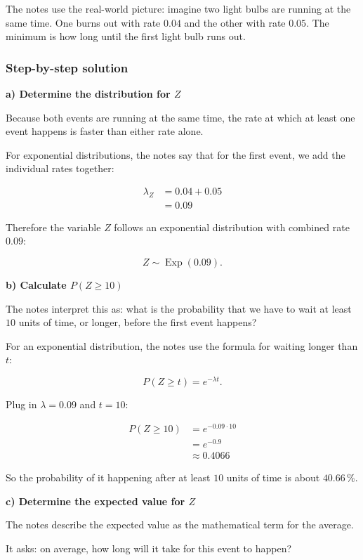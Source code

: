 \documentclass[10pt]{article}
\begin{document}
The notes use the real-world picture:
imagine two light bulbs are running at the same time.
One burns out with rate $0.04$ and the other with rate $0.05$.
The minimum is how long until the first light bulb runs out.

\subsubsection*{Step-by-step solution}

\textbf{a) Determine the distribution for $Z$}

Because both events are running at the same time,
the rate at which at least one event happens is faster
than either rate alone.

For exponential distributions, the notes say that for
the first event, we add the individual rates together:

\begin{align*}
\lambda_Z
&=0.04+0.05 \\[2mm]
&=0.09
\end{align*}

Therefore the variable $Z$ follows an exponential distribution
with combined rate $0.09$:

\[
Z\sim \operatorname{Exp}(0.09).
\]

\textbf{b) Calculate $P(Z\geq 10)$}

The notes interpret this as:
what is the probability that we have to wait at least
$10$ units of time, or longer, before the first event happens?

For an exponential distribution, the notes use the formula
for waiting longer than $t$:

\[
P(Z\geq t)=e^{-\lambda t}.
\]

Plug in $\lambda=0.09$ and $t=10$:

\begin{align*}
P(Z\geq 10)
&=e^{-0.09\cdot 10} \\[2mm]
&=e^{-0.9} \\[2mm]
&\approx 0.4066
\end{align*}

So the probability of it happening after at least
$10$ units of time is about $40.66\,\%$.

\textbf{c) Determine the expected value for $Z$}

The notes describe the expected value as the mathematical
term for the average.

It asks:
on average, how long will it take for this event to happen?
\end{document}
